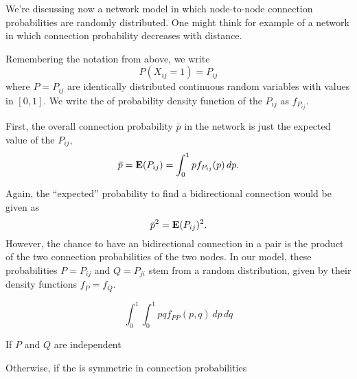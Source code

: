 
We're discussing now a network model in which node-to-node connection probabilities are randomly distributed. One might think for example of a network in which connection probability decreases with distance.

Remembering the notation from above, we write
\[
P(X_{ij}=1) = P_{ij}
\]
where $P=P_{ij}$ are identically distributed continuous random variables with values in $[0,1]$. We write the of probability density function of the $P_{ij}$ as $f_{P_{ij}}$.

First, the overall connection probability $\bar{p}$ in the network is just the expected value of the $P_{ij}$,
\[
\bar{p} = \operatorname{\mathbf{E}}(P_{ij}) = \int_0^1 p f_{P_{ij}}(p)\, dp.
\]

Again, the \enquote{expected} probability to find a bidirectional connection would be given as
\[
\bar{p}^2 = \operatorname{\mathbf{E}}(P_{ij})^2.
\]
However, the chance to have an bidirectional connection in a pair is the product of the two connection probabilities of the two nodes. In our model, these probabilities $P=P_{ij}$ and $Q=P_{ji}$ stem from a random distribution, given by their density functions $f_P = f_Q$.


\[
\int_0^1 \int_0^1 pq f_{PP}(p,q) \,dp\,dq
\]

If $P$ and $Q$ are independent


Otherwise, if the is symmetric in connection probabilities
